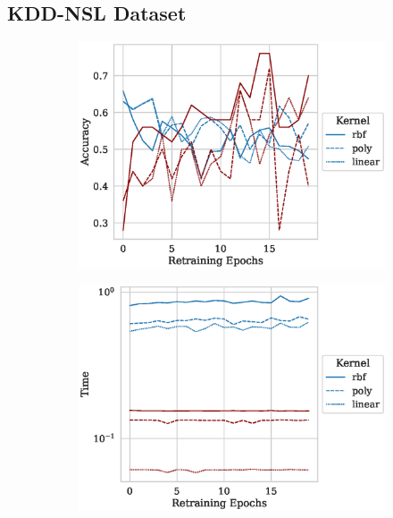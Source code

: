 \documentclass[fonts]{icst}
\begin{document}
\clearpage
\begin{appendices}
\onecolumn
\section{KDD-NSL Dataset}
\label{appendix-1}
\appendix
\begin{figure}[h!]
     \centering
     \begin{subfigure}{0.47\textwidth}
         \centering
         \includegraphics[width=\textwidth]{./kdd-nsl/retrain_accuracy.eps}
     \end{subfigure}
     \hfill
     \begin{subfigure}{0.47\textwidth}
         \centering
         \includegraphics[width=\textwidth]{./kdd-nsl/retrain_time.eps}

\end{subfigure}
\end{figure}
\end{appendices}
\end{document}
